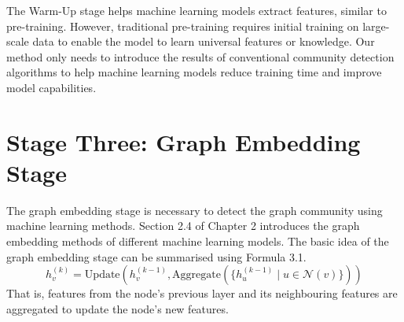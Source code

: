 \documentclass[ %
                    author={Tengyao Tu},
                supervisor={Dr. James Pope},
                    degree={MSc},
                     title={A New Perspective on Graph Community Detection: Combining Traditional Methods with Deep Learning Approaches},
                  subtitle={Applying to Telecom Networks and Diverse Datasets},
                      type={},
                      year={2024}]{dissertation}
\begin{document}
The Warm-Up stage helps machine learning models extract features, similar to pre-training. However, traditional pre-training requires initial training on large-scale data to enable the model to learn universal features or knowledge. Our method only needs to introduce the results of conventional community detection algorithms to help machine learning models reduce training time and improve model capabilities.
\section{Stage Three: Graph Embedding Stage}
The graph embedding stage is necessary to detect the graph community using machine learning methods. Section 2.4 of Chapter 2 introduces the graph embedding methods of different machine learning models. The basic idea of the graph embedding stage can be summarised using Formula 3.1.
\begin{equation}
h_v^{(k)} = \text{Update}\left(h_v^{(k-1)}, \text{Aggregate}\left(\{h_u^{(k-1)} \mid u \in \mathcal{N}(v)\}\right)\right)
\label{eq: Graph Embedding Stage}
\end{equation}
That is, features from the node's previous layer and its neighbouring features are aggregated to update the node's new features.
\end{document}
